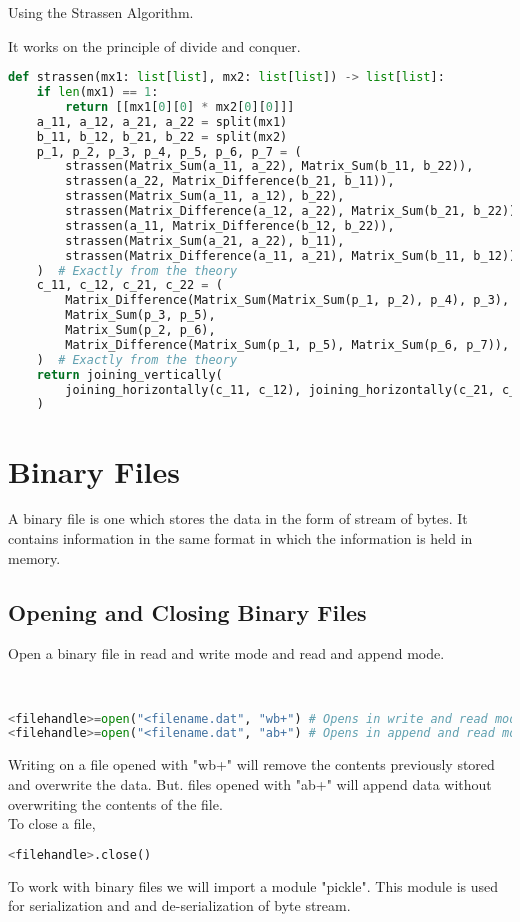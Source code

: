 \begin{eg}
	Using the Strassen Algorithm.
\end{eg}
\begin{explanation}
	It works on the principle of divide and conquer.
	\begin{lstlisting}[language=Python, numbers=none]
def strassen(mx1: list[list], mx2: list[list]) -> list[list]:
	if len(mx1) == 1:
		return [[mx1[0][0] * mx2[0][0]]]
	a_11, a_12, a_21, a_22 = split(mx1)
	b_11, b_12, b_21, b_22 = split(mx2)
	p_1, p_2, p_3, p_4, p_5, p_6, p_7 = (
		strassen(Matrix_Sum(a_11, a_22), Matrix_Sum(b_11, b_22)),
		strassen(a_22, Matrix_Difference(b_21, b_11)),
		strassen(Matrix_Sum(a_11, a_12), b_22),
		strassen(Matrix_Difference(a_12, a_22), Matrix_Sum(b_21, b_22)),
		strassen(a_11, Matrix_Difference(b_12, b_22)),
		strassen(Matrix_Sum(a_21, a_22), b_11),
		strassen(Matrix_Difference(a_11, a_21), Matrix_Sum(b_11, b_12)),
	)  # Exactly from the theory
	c_11, c_12, c_21, c_22 = (
		Matrix_Difference(Matrix_Sum(Matrix_Sum(p_1, p_2), p_4), p_3),
		Matrix_Sum(p_3, p_5),
		Matrix_Sum(p_2, p_6),
		Matrix_Difference(Matrix_Sum(p_1, p_5), Matrix_Sum(p_6, p_7)),
	)  # Exactly from the theory
	return joining_vertically(
		joining_horizontally(c_11, c_12), joining_horizontally(c_21, c_22)
	) \end{lstlisting}
\end{explanation}

\section{Binary Files}
A binary file is one which stores the data in the form of stream of bytes. It contains information in the same format in which the information is held in memory.
\subsection{Opening and Closing Binary Files}
\begin{eg}
	Open a binary file in read and write mode and read and append mode.
\end{eg}
\begin{explanation} \phantom{}\\
	\begin{lstlisting}[language=Python]
<filehandle>=open("<filename.dat", "wb+") # Opens in write and read mode
<filehandle>=open("<filename.dat", "ab+") # Opens in append and read mode \end{lstlisting}
	Writing on a file opened with "wb+" will remove the contents previously stored and overwrite the data. But. files opened with "ab+" will append data without overwriting the contents of the file.\\
	To close a file,
	\begin{lstlisting}[language=Python]
<filehandle>.close()\end{lstlisting}
\end{explanation}
To work with binary files we will import a module "pickle". This module is used for serialization and and de-serialization of byte stream.
